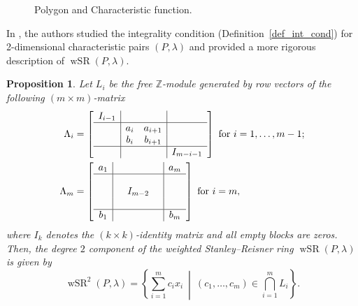 \documentclass[10pt]{amsart}
\theoremstyle{plain}
\newtheorem{proposition}[theorem]{Proposition}
\theoremstyle{definition}
\numberwithin{equation}{section}
\newcommand{\ZZ}{\mathbb{Z}}
\DeclareMathOperator{\wSR}{wSR}
\begin{document}
\begin{figure}
\caption{Polygon and Characteristic function.}
\label{fig_labeling}
\end{figure}

In \cite[Section 5]{DKS}, the authors studied the integrality condition (Definition~\ref{def_int_cond}) for 2-dimensional characteristic pairs $(P, \lambda)$ and provided a more rigorous description of $\wSR(P, \lambda)$.


\begin{proposition}\cite[Theorem 5.2]{DKS}\label{prop_DKS}
Let $L_i$ be the free $\ZZ$-module  generated by row vectors of the following $(m\times m)$-matrix 
\begin{align*}
\Lambda_i & =
\left[ \begin{array}{c|cc|c}
I_{i-1} & &&\\ \hline 
& a_i & a_{i+1}&\\
& b_i& b_{i+1}&\\ \hline
& & & I_{m-i-1} 
\end{array}
\right] \text{   for }  i=1, \dots, m-1;\\
\Lambda_m &= \left[ \begin{array}{c|ccc|c}
a_1 && && a_m\\ \hline 
&&&& \\
& &I_{m-2}& & \\ 
&&&& \\ \hline 
b_1 & &&&  b_m 
\end{array} 
\right] \text{ for }i=m, 
\end{align*}
where $I_k$ denotes the $(k\times k)$-identity matrix and all empty blocks are zeros. Then, the degree $2$ component of the weighted Stanley--Reisner ring $\wSR(P, \lambda)$ is given by 
\begin{equation}\label{eq_wSR2}
\wSR^2(P, \lambda) = 
\left\{ \sum_{i=1}^m c_i x_i ~ \middle|~  (c_1, \dots, c_m)\in \bigcap_{i=1}^m L_i \right\}. 
\end{equation}
\end{proposition}
\end{document}
